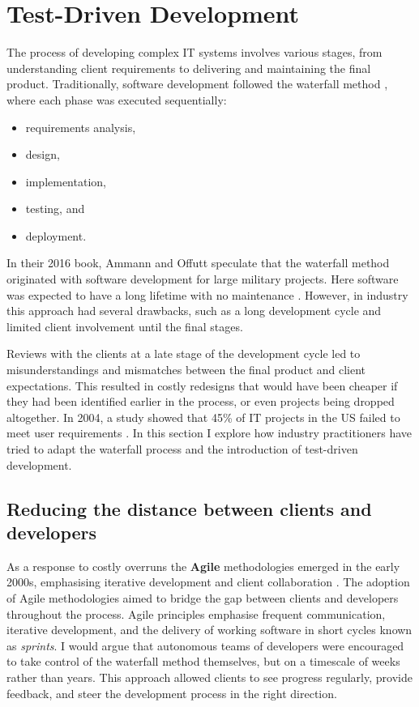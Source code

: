 \documentclass[10pt]{article}
\begin{document}
\section{Test-Driven Development} \label{tdd}
The process of developing complex IT systems involves various stages, from understanding client requirements to delivering and maintaining the final product. Traditionally, software development followed the waterfall method \cite[p. 53]{Amman16}, where each phase was executed sequentially: 
\begin{itemize}
\item requirements  analysis, 
\item design, 
\item implementation, 
\item testing, and 
\item deployment. 
\end{itemize}
In their 2016 book, Ammann and Offutt speculate that the waterfall method originated with software development for large military projects. Here software was expected to have a long lifetime with no maintenance \cite[p. 96]{Amman16}. However, in industry this approach had several drawbacks, such as a long development cycle and limited client involvement until the final stages.  

Reviews with the clients at a late stage of the development cycle led to misunderstandings and mismatches between the final product and client expectations. This resulted in costly redesigns that would have been cheaper if they had been identified earlier in the process, or even projects being dropped altogether. In 2004, a study showed that 45\% of IT projects in the US failed to meet user requirements \cite[p. 88]{LX10}. In this section I explore how industry practitioners have tried to adapt the waterfall process and the introduction of test-driven development.

\subsection{Reducing the distance between clients and developers}
As a response to costly overruns the \textbf{Agile} methodologies emerged in the early 2000s, emphasising iterative development and client collaboration \cite{Anaya18, Beck03}. The adoption of Agile methodologies aimed to bridge the gap between clients and developers throughout the process. Agile principles emphasise frequent communication, iterative development, and the delivery of working software in short cycles known as \emph{sprints}. I would argue that autonomous teams of developers were encouraged to take control of the waterfall method themselves, but on a timescale of weeks rather than years. This approach allowed clients to see progress regularly, provide feedback, and steer the development process in the right direction. 
\end{document}
